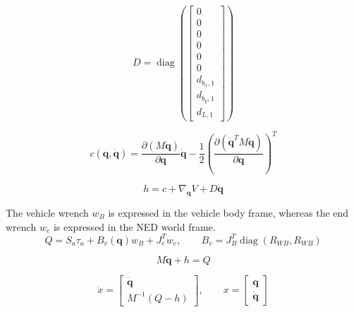 \documentclass[11pt]{article}
\begin{document}
\begin{equation}
D=\operatorname{diag}\!\left(\begin{bmatrix}0\\0\\0\\0\\0\\0\\d_{b_x,1}\\d_{b_y,1}\\d_{L,1}\end{bmatrix}\right)
\end{equation}

\begin{equation}
c(\boldsymbol q,\dot{\boldsymbol q})=\frac{\partial(M\dot{\boldsymbol q})}{\partial\boldsymbol q}\dot{\boldsymbol q}-\frac12\left(\frac{\partial(\dot{\boldsymbol q}^{T}M\dot{\boldsymbol q})}{\partial\boldsymbol q}\right)^T
\end{equation}

\begin{equation}
h=c+\nabla_{\boldsymbol q}V+D\dot{\boldsymbol q}
\end{equation}

The vehicle wrench $w_B$ is expressed in the vehicle body frame, whereas the end wrench $w_e$ is expressed in the NED world frame.
\begin{equation}
Q=S_a\tau_a+B_v(\boldsymbol q)w_B+J_e^Tw_e,\qquad B_v=J_B^T\operatorname{diag}(R_{WB},R_{WB})
\end{equation}

\begin{equation}
M\ddot{\boldsymbol q}+h=Q\label{eq:dynamics}
\end{equation}

\begin{equation}
\dot x=\begin{bmatrix}\dot{\boldsymbol q}\\M^{-1}(Q-h)\end{bmatrix},\qquad x=\begin{bmatrix}\boldsymbol q\\\dot{\boldsymbol q}\end{bmatrix}
\end{equation}
\end{document}
